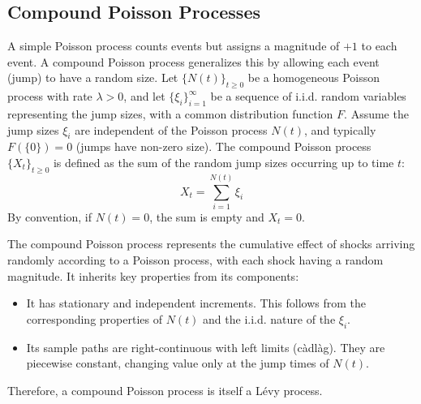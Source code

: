 \documentclass[11pt,twoside,openright]{report}
\begin{document}
\subsection{Compound Poisson Processes}
\label{subsec:compound_poisson}

A simple Poisson process counts events but assigns a magnitude of $+1$ to each event. A compound Poisson process generalizes this by allowing each event (jump) to have a random size. Let $\{N(t)\}_{t \ge 0}$ be a homogeneous Poisson process with rate $\lambda > 0$, and let $\{\xi_i\}_{i=1}^\infty$ be a sequence of i.i.d. random variables representing the jump sizes, with a common distribution function $F$. Assume the jump sizes $\xi_i$ are independent of the Poisson process $N(t)$, and typically $F(\{0\}) = 0$ (jumps have non-zero size). The compound Poisson process $\{X_t\}_{t \ge 0}$ is defined as the sum of the random jump sizes occurring up to time $t$:
\begin{equation}
X_t = \sum_{i=1}^{N(t)} \xi_i
\label{eq:compound_poisson}
\end{equation}
By convention, if $N(t)=0$, the sum is empty and $X_t = 0$.

The compound Poisson process represents the cumulative effect of shocks arriving randomly according to a Poisson process, with each shock having a random magnitude. It inherits key properties from its components:
\begin{itemize}
    \item It has stationary and independent increments. This follows from the corresponding properties of $N(t)$ and the i.i.d. nature of the $\xi_i$.
    \item Its sample paths are right-continuous with left limits (càdlàg). They are piecewise constant, changing value only at the jump times of $N(t)$.
\end{itemize}
Therefore, a compound Poisson process is itself a Lévy process.

\end{document}
